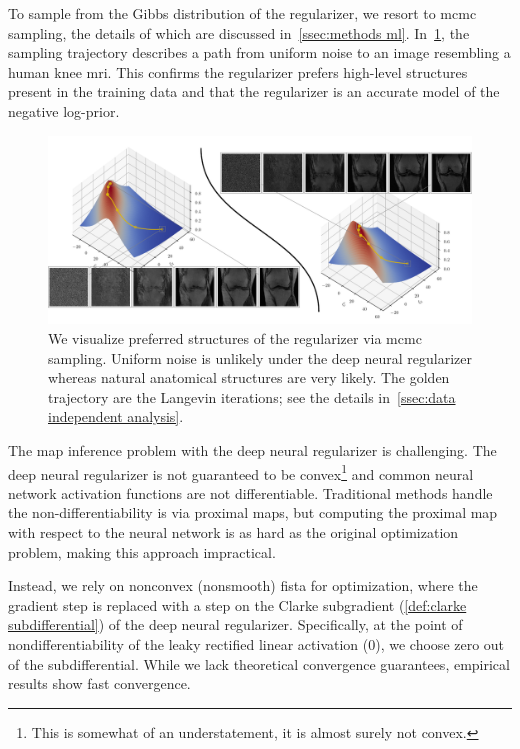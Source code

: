 To sample from the Gibbs distribution of the regularizer, we resort to \gls{mcmc} sampling, the details of which are discussed in~\cref{ssec:methods ml}.
In~\cref{fig:mri sampling}, the sampling trajectory describes a path from uniform noise to an image resembling a human knee \gls{mri}.
This confirms the regularizer prefers high-level structures present in the training data and that the regularizer is an accurate model of the negative log-prior.
\begin{figure}
	\centering
	\includegraphics[width=\linewidth]{mri-sampling}
	\caption[Sampling a deep neural regularizer]{%
		We visualize preferred structures of the regularizer via \gls{mcmc} sampling.
		Uniform noise is unlikely under the deep neural regularizer whereas natural anatomical structures are very likely.
		The golden trajectory are the Langevin iterations; see the details in~\cref{ssec:data independent analysis}.
	}%
	\label{fig:mri sampling}
\end{figure}

The \gls{map} inference problem with the deep neural regularizer is challenging.
The deep neural regularizer is not guaranteed to be convex\footnote{%
	This is somewhat of an understatement, it is almost surely not convex.
} and common neural network activation functions are not differentiable.
Traditional methods handle the non-differentiability is via proximal maps, but computing the proximal map with respect to the neural network is as hard as the original optimization problem, making this approach impractical.

Instead, we rely on nonconvex (nonsmooth) \gls{fista} for optimization, where the gradient step is replaced with a step on the Clarke subgradient (\cref{def:clarke subdifferential}) of the deep neural regularizer.
Specifically, at the point of nondifferentiability of the leaky rectified linear activation (\(\num{0}\)), we choose zero out of the subdifferential.
While we lack theoretical convergence guarantees, empirical results show fast convergence.

